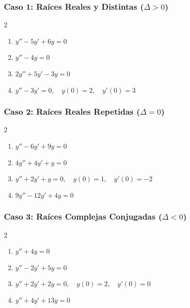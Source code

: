 \documentclass[a4paper,11pt]{article}
\begin{document}
\subsubsection*{Caso 1: Raíces Reales y Distintas ($\Delta > 0$)}
\begin{multicols}{2}
\begin{enumerate}[itemsep=0.15cm]
    \item $y'' - 5y' + 6y = 0$
    \item $y'' - 4y = 0$
    \item $2y'' + 5y' - 3y = 0$
    \item $y'' - 3y' = 0, \quad y(0) = 2, \quad y'(0) = 3$
\end{enumerate}
\end{multicols}

\subsubsection*{Caso 2: Raíces Reales Repetidas ($\Delta = 0$)}
\begin{multicols}{2}
\begin{enumerate}[itemsep=0.15cm, start=5]
    \item $y'' - 6y' + 9y = 0$
    \item $4y'' + 4y' + y = 0$
    \item $y'' + 2y' + y = 0, \quad y(0) = 1, \quad y'(0) = -2$
    \item $9y'' - 12y' + 4y = 0$
\end{enumerate}
\end{multicols}

\subsubsection*{Caso 3: Raíces Complejas Conjugadas ($\Delta < 0$)}
\begin{multicols}{2}
\begin{enumerate}[itemsep=0.15cm, start=9]
    \item $y'' + 4y = 0$
    \item $y'' - 2y' + 5y = 0$
    \item $y'' + 2y' + 2y = 0, \quad y(0) = 2, \quad y'(0) = 0$
    \item $y'' + 4y' + 13y = 0$
\end{enumerate}
\end{multicols}
\end{document}
